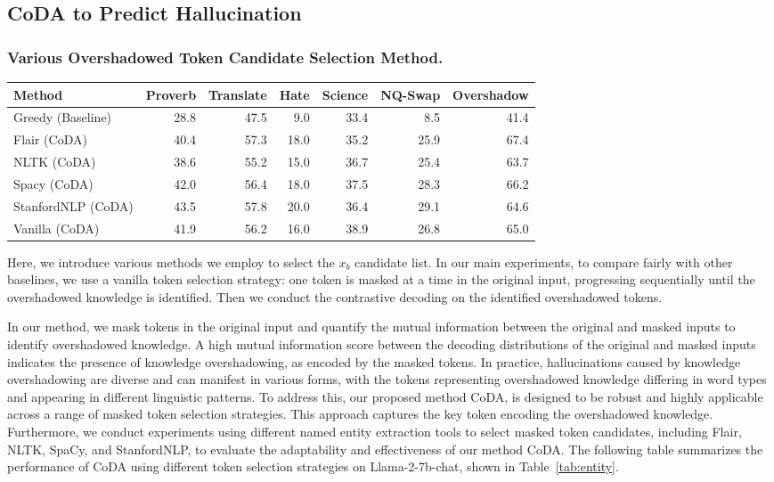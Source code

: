 \subsection{CoDA to Predict Hallucination}
\label{ssec:coda_app}
\subsubsection{Various Overshadowed Token Candidate Selection Method.}
\begin{table*}[t]
\centering
\small
\caption{Comparison of various entity extraction methods.}
\begin{tabular}{lrrrrrr}
\toprule
Method & Proverb & Translate & Hate & Science & NQ-Swap & Overshadow \\
\midrule
Greedy (Baseline) & 28.8 & 47.5 & 9.0 & 33.4 & 8.5 & 41.4 \\
Flair (CoDA) & 40.4 & 57.3 & 18.0 & 35.2 & 25.9 & 67.4 \\
NLTK (CoDA) & 38.6 & 55.2 & 15.0 & 36.7 & 25.4 & 63.7 \\
Spacy (CoDA) & 42.0 & 56.4 & 18.0 & 37.5 & 28.3 & 66.2 \\
StanfordNLP (CoDA) & 43.5 & 57.8 & 20.0 & 36.4 & 29.1 & 64.6 \\
Vanilla (CoDA) & 41.9 & 56.2 & 16.0 & 38.9 & 26.8 & 65.0 \\
\bottomrule
\end{tabular}
\label{tab:entity}
\end{table*}

Here, we introduce various methods we employ to select the $x_b$ candidate list. In our main experiments, to compare fairly with other baselines, we use a vanilla token selection strategy: one token is masked at a time in the original input, progressing sequentially until the overshadowed knowledge is identified. Then we conduct the contrastive decoding on the identified overshadowed tokens.

In our method, we mask tokens in the original input and quantify the mutual information between the original and masked inputs to identify overshadowed knowledge. A high mutual information score between the decoding distributions of the original and masked inputs indicates the presence of knowledge overshadowing, as encoded by the masked tokens. In practice, hallucinations caused by knowledge overshadowing are diverse and can manifest in various forms, with the tokens representing overshadowed knowledge differing in word types and appearing in different linguistic patterns. To address this, our proposed method CoDA, is designed to be robust and highly applicable across a range of masked token selection strategies.
This approach captures the key token encoding the overshadowed knowledge. Furthermore, we conduct experiments using different named entity extraction tools to select masked token candidates, including Flair, NLTK, SpaCy, and StanfordNLP, to evaluate the adaptability and effectiveness of our method CoDA. The following table summarizes the performance of CoDA using different token selection strategies on Llama-2-7b-chat, shown in Table~\ref{tab:entity}.



